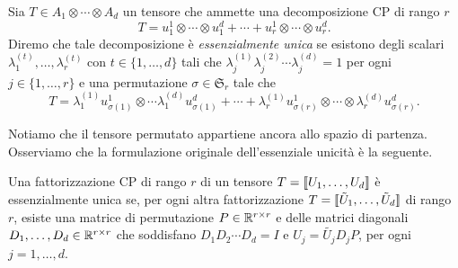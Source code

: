\begin{definition}
	Sia $ T \in A_1 \otimes \cdots \otimes A_{d}$ un tensore che ammette una decomposizione CP di rango $ r $
	\begin{equation*}
		T = u_1^1 \otimes \cdots \otimes u_1^d + \cdots + u_{r}^1 \otimes \cdots \otimes u_{r}^d.
	\end{equation*}
	Diremo che tale decomposizione è \emph{essenzialmente unica} se esistono degli scalari $ \lambda_{1}^{(t)}, \ldots, \lambda_{r}^{(t)} $ con $ t
		\in \{1, \ldots, d\} $ tali che $ \lambda_{j}^{(1)}\lambda_{j}^{(2)} \cdots \lambda_{j}^{(d)} = 1 $ per ogni $
		j \in \{1, \ldots, r\}  $ e una permutazione $ \sigma \in \mathfrak{S}_{r} $ tale che
	\begin{equation*}
		T = \lambda_{1}^{(1)}u_{\sigma(1)}^{1} \otimes \cdots \lambda_{1}^{(d)}u_{\sigma(1)}^{d} +
		\cdots + \lambda_{r}^{(1)}u_{\sigma(r)}^{1} \otimes \cdots \otimes
		\lambda_{r}^{(d)}u_{\sigma(r)}^{d}.
	\end{equation*}
\end{definition}
Notiamo che il tensore permutato appartiene ancora allo spazio di partenza. Osserviamo che la formulazione
originale dell'essenziale unicità è la seguente.
\begin{definition}
	Una fattorizzazione CP di rango $ r $ di un tensore $ T = \dsqr{U_1, \ldots, U_d}$ è
	essenzialmente unica se, per ogni altra fattorizzazione $ T = \dsqr{\tilde{U}_1,
			\ldots, \tilde{U}_d}$ di rango $ r $, esiste una matrice di permutazione $ P \in \mathbb{R}^{r \times r} $
	e delle matrici diagonali $ D_1, \ldots, D_d \in \mathbb{R}^{r \times r} $ che soddisfano $ D_1 D_2 \cdots D_d =
		I$ e $U_j = \tilde{U_j}D_jP$, per ogni $ j = 1, \ldots, d $.
\end{definition}
